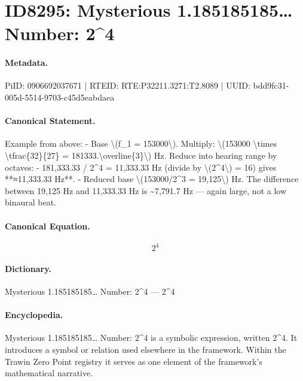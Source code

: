 \section*{ID8295: Mysterious 1.185185185… Number: 2\textasciicircum{}4}
\paragraph{Metadata.}
PiID: 0906692037671 | RTEID: RTE:P32211.3271:T2.8089 | UUID: bdd9fc31-005d-5514-9703-c45d5eabdaea

\paragraph{Canonical Statement.}
Example from above: - Base \textbackslash{}(f\_1 = 153000\textbackslash{}). Multiply: \textbackslash{}(153000 \textbackslash{}times \textbackslash{}tfrac\{32\}\{27\} = 181333.\textbackslash{}overline\{3\}\textbackslash{}) Hz. Reduce into hearing range by octaves: - 181,333.33 / 2\textasciicircum{}4 = 11,333.33 Hz (divide by \textbackslash{}(2\textasciicircum{}4\textbackslash{}) = 16) gives **≈11,333.33 Hz**. - Reduced base \textbackslash{}(153000/2\textasciicircum{}3 = 19,125\textbackslash{}) Hz. The difference between 19,125 Hz and 11,333.33 Hz is \textasciitilde{}7,791.7 Hz — again large, not a low binaural beat.

\paragraph{Canonical Equation.}
\[
2^4
\]

\paragraph{Dictionary.}
Mysterious 1.185185185… Number: 2\textasciicircum{}4 — 2\textasciicircum{}4

\paragraph{Encyclopedia.}
Mysterious 1.185185185… Number: 2\textasciicircum{}4 is a symbolic expression, written 2\textasciicircum{}4. It introduces a symbol or relation used elsewhere in the framework. Within the Trawin Zero Point registry it serves as one element of the framework's mathematical narrative.
